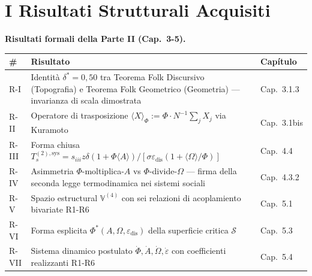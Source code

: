 \section{I Risultati Strutturali
Acquisiti}\label{i-risultati-strutturali-acquisiti}

\Proved{} \textbf{Risultati formali della Parte II (Cap.~3-5).}

{\def\LTcaptype{none} %
{\small\begin{longtable}[]{@{}
  >{\raggedright\arraybackslash}p{}
  >{\raggedright\arraybackslash}p{}
  >{\raggedright\arraybackslash}p{}@{}}
\toprule\noalign{}
\begin{minipage}[b]{\linewidth}\raggedright
\#
\end{minipage} & \begin{minipage}[b]{\linewidth}\raggedright
Risultato
\end{minipage} & \begin{minipage}[b]{\linewidth}\raggedright
Capítulo
\end{minipage} \\
\midrule\noalign{}
\endhead
\bottomrule\noalign{}
\endlastfoot
R-I & Identità \(\delta^* = 0{,}50\) tra Teorema Folk Discursivo
(Topografia) e Teorema Folk Geometrico (Geometria) --- invarianza di
scala dimostrata & Cap.~3.1.3 \\
R-II & Operatore di trasposizione
\(\langle X \rangle_\Phi := \Phi \cdot N^{-1}\sum_j X_j\) via Kuramoto &
Cap.~3.1bis \\
R-III & Forma chiusa
\(T_s^{(2),\text{sys}} = s_{iii} z \delta (1+\Phi\langle A\rangle) / [\sigma \varepsilon_{\text{dis}} (1 + \langle\Omega\rangle/\Phi)]\)
& Cap.~4.4 \\
R-IV & Asimmetria \(\Phi\)-moltiplica-\(A\) vs
\(\Phi\)-divide-\(\Omega\) --- firma della seconda legge termodinamica
nei sistemi sociali & Cap.~4.3.2 \\
R-V & Spazio estructural \(\mathbb{V}^{(4)}\) con sei relazioni di
acoplamiento bivariate R1-R6 & Cap.~5.1 \\
R-VI & Forma esplicita \(\Phi^*(A, \Omega, \varepsilon_{\text{dis}})\)
della superficie critica \(\mathcal{S}\) & Cap.~5.3 \\
R-VII & Sistema dinamico postulato
\(\dot\Phi, \dot A, \dot\Omega, \dot\varepsilon\) con coefficienti
realizzanti R1-R6 & Cap.~5.4 \\
\end{longtable}}
}

